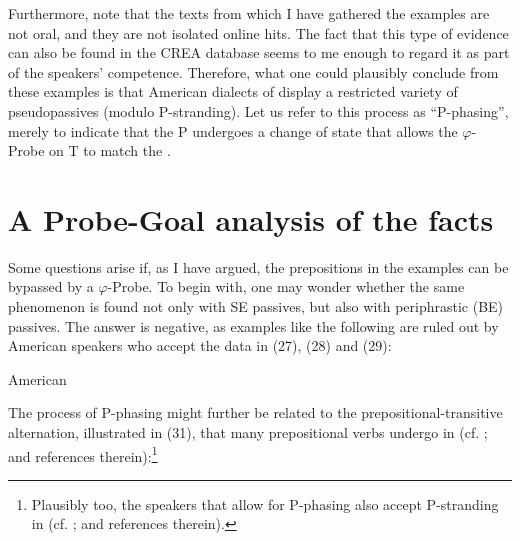 \documentclass[output=paper]{langsci/langscibook}
\begin{document}
Furthermore, note that the texts from which I have gathered the examples are not oral, and they are not isolated online hits. The fact that this type of evidence can also be found in the CREA database seems to me enough to regard it as part of the speakers’ competence. Therefore, what one could plausibly conclude from these examples is that American dialects of  display a restricted variety of pseudopassives (modulo P-stranding). Let us refer to this process as “P-phasing”, merely to indicate that the P undergoes a change of state that allows the $\varphi ${}-Probe on T to match the \CATDP. 

\section{A Probe-Goal analysis of the facts}%


Some questions arise if, as I have argued, the prepositions in the examples can be bypassed by a $\varphi ${}-Probe. To begin with, one may wonder whether the same phenomenon is found not only with SE passives, but also with periphrastic (BE) passives. The answer is negative, as examples like the following are ruled out by American  speakers who accept the data in  (27), (28) and (29):



\ea%
    American \label{ex:gallego:31}\\
    \z
\z    

The process of P-phasing might further be related to the prepositional-transitive alternation, illustrated in (31), that many prepositional verbs undergo in  (cf. \citealt{Demonte1991,García-Miguel1995,Gallego2010}; and references therein):\footnote{Plausibly too, the speakers that allow for P-phasing also accept P-stranding in  (cf. \citealt{Depiante2013,Lemos2013}; and references therein).}
\end{document}
